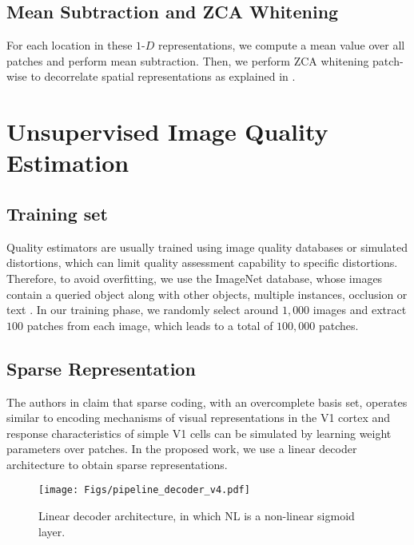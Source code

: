 \documentclass[draftcls,12pt, onecolumn]{IEEEtran}
\begin{document}
\subsection{Mean Subtraction and ZCA Whitening}
For each location in these $1$-$D$ representations, we compute a mean value over all patches and perform mean subtraction. Then, we perform ZCA whitening patch-wise to decorrelate spatial representations as explained in \cite{chang2012}. 
\vspace{-2.0mm}

\section{Unsupervised Image Quality Estimation}

\vspace{-1.0mm}

\subsection{Training set}
\vspace{-1.0mm}
Quality estimators are usually trained using image quality databases or simulated distortions, which can limit quality assessment capability to specific distortions. Therefore, to avoid overfitting, we use the ImageNet database, whose images contain a queried object along with other objects, multiple instances, occlusion or text \cite{ImageNet_VSS09}. In our training phase, we randomly select around $1,000$ images and  extract $100$ patches from each image, which leads to a total of $100,000$ patches.
\vspace{-3.5mm}

\subsection{Sparse Representation}
\vspace{-1.0mm}
The authors in \cite{olshausen1997sparse} claim that sparse coding, with an overcomplete basis set, operates similar to encoding mechanisms of visual representations in the V1 cortex and response characteristics of simple V1 cells can be simulated by learning weight parameters over patches. In the proposed work, we use a linear decoder architecture to obtain sparse representations.



\begin{figure}[htbp!]
	\begin{center}
		\noindent
		\texttt{[image: Figs/pipeline\_decoder\_v4.pdf]}
		\vspace{-1.5mm}
	    \caption{Linear decoder architecture, in which NL is a non-linear sigmoid layer.}
		\vspace{-7.0mm}
		\label{fig:decoder}
	\end{center}
\end{figure}
\end{document}
